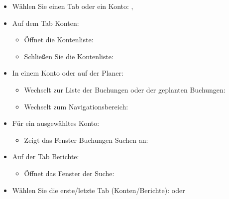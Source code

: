 \begin{itemize}
	\item Wählen Sie einen Tab oder ein Konto: \keys{\arrowkeyup}, \keys{\arrowkeydown}
	\item Auf dem Tab Konten:
	\begin{itemize}
		\item Öffnet die Kontenliste: \keys{\arrowkeyright}
		\item Schließen Sie die Kontenliste: \keys{\arrowkeyleft}
	\end{itemize}
	\item In einem Konto oder auf der Planer:
	\begin{itemize}
		\item Wechselt zur Liste der Buchungen oder der geplanten Buchungen: \keys{\arrowkeyright}
		\item Wechselt zum Navigationsbereich: \keys{\arrowkeyleft}
	\end{itemize}
	\item Für ein ausgewähltes Konto:
	\begin{itemize}
		\item Zeigt das Fenster {Buchungen Suchen} an: 
	\end{itemize}
	\item Auf der Tab Berichte:
	\begin{itemize}
		\item Öffnet das Fenster  der Suche: 
	\end{itemize}	
	\item Wählen Sie die erste/letzte Tab (Konten/Berichte):  oder 
\end{itemize}

